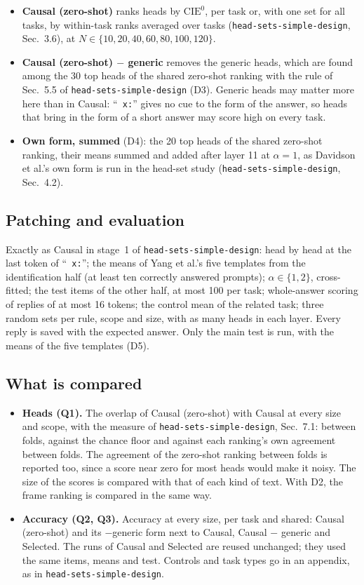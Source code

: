 \documentclass[10pt,a4paper]{article}
\newcommand{\p}[1]{``\texttt{#1}''}
\newcommand{\simpledoc}{\texttt{head-sets-simple-design}}
\begin{document}
\begin{itemize}
\item \textbf{Causal (zero-shot)} ranks heads by $\mathrm{CIE}^{0}$, per task or, with one set for all tasks, by within-task ranks averaged over tasks (\simpledoc, Sec.~3.6), at $N\in\{10,20,40,60,80,100,120\}$.
\item \textbf{Causal (zero-shot) $-$ generic} removes the generic heads, which are found among the 30 top heads of the shared zero-shot ranking with the rule of Sec.~5.5 of \simpledoc{} (D3). Generic heads may matter more here than in Causal: \p{ x:} gives no cue to the form of the answer, so heads that bring in the form of a short answer may score high on every task.
\item \textbf{Own form, summed} (D4): the 20 top heads of the shared zero-shot ranking, their means summed and added after layer 11 at $\alpha=1$, as Davidson et al.'s own form is run in the head-set study (\simpledoc, Sec.~4.2).
\end{itemize}

\subsection{Patching and evaluation}\label{sec:patching}

Exactly as Causal in stage~1 of \simpledoc{}: head by head at the last token of \p{ x:}; the means of Yang et al.'s five templates from the identification half (at least ten correctly answered prompts); $\alpha\in\{1,2\}$, cross-fitted; the test items of the other half, at most 100 per task; whole-answer scoring of replies of at most 16 tokens; the control mean of the related task; three random sets per rule, scope and size, with as many heads in each layer. Every reply is saved with the expected answer. Only the main test is run, with the means of the five templates (D5).

\subsection{What is compared}\label{sec:compare}

\begin{itemize}
\item \textbf{Heads (Q1).} The overlap of Causal (zero-shot) with Causal at every size and scope, with the measure of \simpledoc, Sec.~7.1: between folds, against the chance floor and against each ranking's own agreement between folds. The agreement of the zero-shot ranking between folds is reported too, since a score near zero for most heads would make it noisy. The size of the scores is compared with that of each kind of text. With D2, the frame ranking is compared in the same way.
\item \textbf{Accuracy (Q2, Q3).} Accuracy at every size, per task and shared: Causal (zero-shot) and its $-$generic form next to Causal, Causal $-$ generic and Selected. The runs of Causal and Selected are reused unchanged; they used the same items, means and test. Controls and task types go in an appendix, as in \simpledoc.
\end{itemize}
\end{document}
